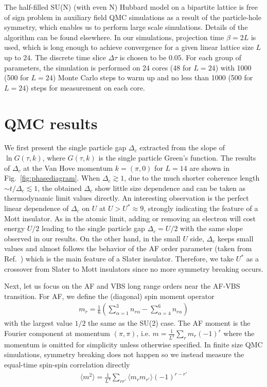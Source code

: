 \documentclass[twocolumn,superscriptaddress,prb]{revtex4-1}
\begin{document}
The half-filled SU(N) (with even N) Hubbard model on a bipartite lattice is free of sign problem in auxiliary field QMC simulations as a result of the particle-hole symmetry, \cite{Cai_PRL_2013} which enables us to perform large scale simulations. Details of the algorithm can be found elsewhere. \cite{Assaad_CMP_2008,Wang_PRL_2014,Zhou_PRB_2016} In our simulations, projection time $\beta=2L$ is used, which is long enough to achieve convergence for a given linear lattice size $L$ up to $24$. The discrete time slice $\Delta\tau$ is chosen to be $0.05$. For each group of parameters, the simulation is performed on 24 cores (48 for $L=24$) with 1000 (500 for $L=24$) Monte Carlo steps to warm up and no less than 1000 (500 for $L=24$) steps for measurement on each core. 



\section{QMC results}

We first present the single particle gap $\Delta_c$ extracted from the slope of $\ln G(\tau,k)$, where $G(\tau,k)$ is the single particle Green's function. The results of $\Delta_c$ at the Van Hove momentum $k=(\pi,0)$ for $L=14$ are shown in Fig.~\ref{fig:phasediagram}. When $\Delta_c\gtrsim1$, due to the much shorter coherence length $\sim t/\Delta_c\lesssim1$, the obtained $\Delta_c$ show little size dependence and can be taken as thermodynamic limit values directly. An interesting observation is the perfect linear dependence of $\Delta_c$ on $U$ at $U>U^*\approx 9$, strongly indicating the feature of a Mott insulator. As in the atomic limit, adding or removing an electron will cost energy $U/2$ leading to the single particle gap $\Delta_c=U/2$ with the same slope observed in our results. On the other hand, in the small $U$ side, $\Delta_c$ keeps small values and almost follows the behavior of the AF order parameter (taken from Ref.~) which is the main feature of a Slater insulator. Therefore, we take $U^*$ as a crossover from Slater to Mott insulators since no more symmetry breaking occurs.

Next, let us focus on the AF and VBS long range orders near the AF-VBS transition. For AF, we define the (diagonal) spin moment operator 
\begin{eqnarray}
  m_r=\frac{1}{6}\left( \sum_{\alpha=1}^{3}n_{r\alpha} -\sum_{\alpha=4}^{6}n_{r\alpha} \right)
\end{eqnarray}
with the largest value $1/2$ the same as the SU(2) case. The AF moment is the Fourier component at momentum $(\pi,\pi)$, i.e. $m=\frac{1}{L^2}\sum_{r}m_r(-1)^r$ where the momentum is omitted for simplicity unless otherwise specified. In finite size QMC simulations, symmetry breaking does not happen so we instead measure the equal-time spin-spin correlation directly
\begin{eqnarray}
  \langle m^2 \rangle=\frac{1}{L^4}\sum_{rr'}\langle m_rm_{r'}\rangle (-1)^{r-r'}
\end{eqnarray}
\end{document}
